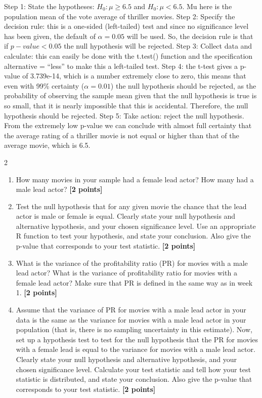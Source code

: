 \documentclass[
]{article}
\providecommand{\tightlist}{%
  \setlength{\itemsep}{0pt}\setlength{\parskip}{0pt}}
\begin{document}
Step 1: State the hypotheses: \(H_0: \mu\geq6.5\) and \(H_0:\mu<6.5\).
Mu here is the population mean of the vote average of thriller movies.
Step 2: Specify the decision rule: this is a one-sided (left-tailed)
test and since no significance level has been given, the default of
\(\alpha=0.05\) will be used. So, the decision rule is that if
\(p-value<0.05\) the null hypothesis will be rejected. Step 3: Collect
data and calculate: this can easily be done with the t.test() function
and the specification alternative = ``less'' to make this a left-tailed
test. Step 4: the t-test gives a p-value of 3.739e-14, which is a number
extremely close to zero, this means that even with 99\% certainty
(\(\alpha=0.01\)) the null hypothesis should be rejected, as the
probability of observing the sample mean given that the null hypothesis
is true is so small, that it is nearly impossible that this is
accidental. Therefore, the null hypothesis should be rejected. Step 5:
Take action: reject the null hypothesis. From the extremely low p-value
we can conclude with almost full certainty that the average rating of a
thriller movie is not equal or higher than that of the average movie,
which is 6.5.

2

\begin{enumerate}
\def\labelenumi{\alph{enumi}.}
\tightlist
\item
  How many movies in your sample had a female lead actor? How many had a
  male lead actor? \textbf{[2 points]}
\item
  Test the null hypothesis that for any given movie the chance that the
  lead actor is male or female is equal. Clearly state your null
  hypothesis and alternative hypothesis, and your chosen significance
  level. Use an appropriate R function to test your hypothesis, and
  state your conclusion. Also give the p-value that corresponds to your
  test statistic. \textbf{[2 points]}
\item
  What is the variance of the profitability ratio (PR) for movies with a
  male lead actor? What is the variance of profitability ratio for
  movies with a female lead actor? Make sure that PR is defined in the
  same way as in week 1. \textbf{[2 points]}
\item
  Assume that the variance of PR for movies with a male lead actor in
  your data is the same as the variance for movies with a male lead
  actor in your population (that is, there is no sampling uncertainty in
  this estimate). Now, set up a hypothesis test to test for the null
  hypothesis that the PR for movies with a female lead is equal to the
  variance for movies with a male lead actor. Clearly state your null
  hypothesis and alternative hypothesis, and your chosen significance
  level. Calculate your test statistic and tell how your test statistic
  is distributed, and state your conclusion. Also give the p-value that
  corresponds to your test statistic. \textbf{[2 points]}
\end{enumerate}
\end{document}
